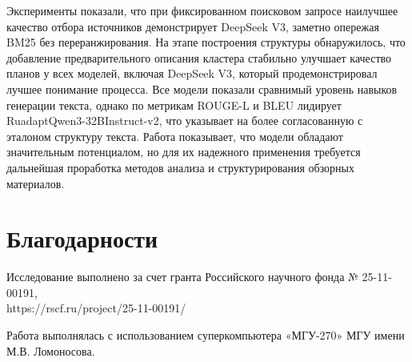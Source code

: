 \documentclass{article}
\begin{document}
Эксперименты показали, что при фиксированном поисковом запросе наилучшее качество отбора источников демонстрирует DeepSeek V3, 
заметно опережая BM25 без переранжирования.
На этапе построения структуры обнаружилось, что добавление предварительного описания кластера стабильно улучшает качество планов у всех моделей, включая DeepSeek V3, который продемонстрировал лучшее понимание процесса.
Все модели показали сравнимый уровень навыков генерации текста, однако по метрикам ROUGE-L и BLEU лидирует RuadaptQwen3-\allowbreak 32BInstruct-v2, что указывает на более согласованную с эталоном структуру текста.
Работа показывает, что модели обладают значительным потенциалом, 
но для их надежного применения требуется дальнейшая проработка методов анализа и структурирования обзорных материалов.

\section*{Благодарности}
Исследование выполнено за счет гранта Российского научного фонда № 25-11-00191, \\https://rscf.ru/project/25-11-00191/

Работа выполнялась с использованием суперкомпьютера «МГУ-270» МГУ имени М.В. Ломоносова.
\end{document}
